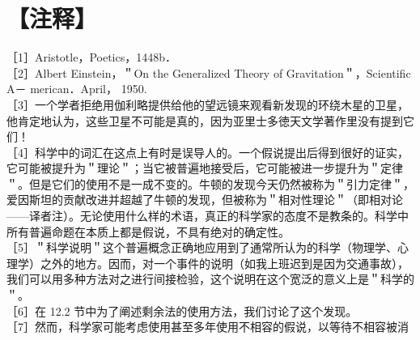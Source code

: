 \section*{【注释】}
［1］Aristotle，Poetics，1448b．\\
［2］Albert Einstein，＂On the Generalized Theory of Gravitation＂，Scientific A－ merican．April， 1950.\\
［3］一个学者拒绝用伽利略提供给他的望远镜来观看新发现的环绕木星的卫星，他肯定地认为，这些卫星不可能是真的，因为亚里士多徳天文学著作里没有提到它们！\\
［4］科学中的词汇在这点上有时是误导人的。一个假说提出后得到很好的证实，它可能被提升为＂理论＂；当它被普遍地接受后，它可能被进一步提升为＂定律＂。但是它们的使用不是一成不变的。牛顿的发现今天仍然被称为＂引力定律＂，爱因斯坦的贡献改进并超越了牛顿的发现，但被称为＂相对性理论＂（即相对论——译者注）。无论使用什么样的术语，真正的科学家的态度不是教条的。科学中所有普遍命题在本质上都是假说，不具有绝对的确定性。\\
［5］＂科学说明＂这个普遍概念正确地应用到了通常所认为的科学（物理学、心理学）之外的地方。因而，对一个事件的说明（如我上班迟到是因为交通事故），我们可以用多种方法对之进行间接检验，这个说明在这个宽泛的意义上是＂科学的＂。\\
［6］在 12.2 节中为了阐述剩余法的使用方法，我们讨论了这个发现。\\
［7］然而，科学家可能考虑使用甚至多年使用不相容的假说，以等待不相容被消


